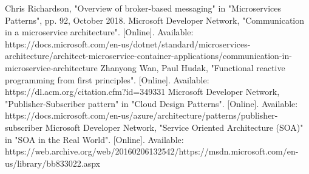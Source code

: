 \documentclass[conference]{IEEEtran}
\begin{document}
\begin{thebibliography}{1}
Chris Richardson, "Overview of broker-based messaging" in "Microservices Patterns", pp. 92, October 2018.
Microsoft Developer Network, "Communication in a microservice architecture". [Online]. Available: https://docs.microsoft.com/en-us/dotnet/standard/microservices-architecture/architect-microservice-container-applications/communication-in-microservice-architecture
Zhanyong Wan, Paul Hudak, "Functional reactive programming from first principles". [Online]. Available: https://dl.acm.org/citation.cfm?id=349331
Microsoft Developer Network, "Publisher-Subscriber pattern" in "Cloud Design Patterns". [Online]. Available: https://docs.microsoft.com/en-us/azure/architecture/patterns/publisher-subscriber
Microsoft Developer Network, "Service Oriented Architecture (SOA)" in "SOA in the Real World". [Online]. Available: https://web.archive.org/web/20160206132542/https://msdn.microsoft.com/en-us/library/bb833022.aspx

\end{thebibliography}




\end{document}
